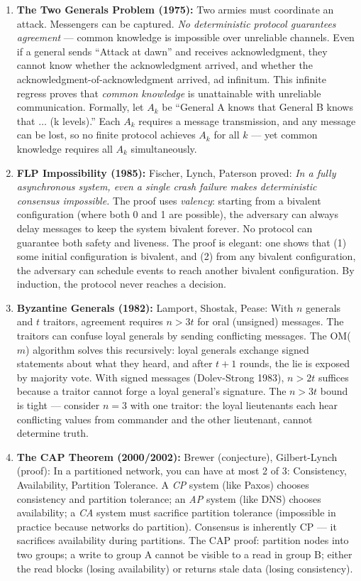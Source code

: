\begin{enumerate}
\item \textbf{The Two Generals Problem (1975):} Two armies must coordinate an attack. Messengers can be captured. \emph{No deterministic protocol guarantees agreement} — common knowledge is impossible over unreliable channels. Even if a general sends ``Attack at dawn'' and receives acknowledgment, they cannot know whether the acknowledgment arrived, and whether the acknowledgment-of-acknowledgment arrived, ad infinitum. This infinite regress proves that \emph{common knowledge} is unattainable with unreliable communication. Formally, let $A_k$ be ``General A knows that General B knows that $\ldots$ (k levels).'' Each $A_k$ requires a message transmission, and any message can be lost, so no finite protocol achieves $A_k$ for all $k$ — yet common knowledge requires all $A_k$ simultaneously.

\item \textbf{FLP Impossibility (1985):} Fischer, Lynch, Paterson proved: \emph{In a fully asynchronous system, even a single crash failure makes deterministic consensus impossible.} The proof uses \emph{valency}: starting from a bivalent configuration (where both 0 and 1 are possible), the adversary can always delay messages to keep the system bivalent forever. No protocol can guarantee both safety and liveness. The proof is elegant: one shows that (1) some initial configuration is bivalent, and (2) from any bivalent configuration, the adversary can schedule events to reach another bivalent configuration. By induction, the protocol never reaches a decision.

\item \textbf{Byzantine Generals (1982):} Lamport, Shostak, Pease: With $n$ generals and $t$ traitors, agreement requires $n > 3t$ for oral (unsigned) messages. The traitors can confuse loyal generals by sending conflicting messages. The OM($m$) algorithm solves this recursively: loyal generals exchange signed statements about what they heard, and after $t+1$ rounds, the lie is exposed by majority vote. With signed messages (Dolev-Strong 1983), $n > 2t$ suffices because a traitor cannot forge a loyal general's signature. The $n > 3t$ bound is tight — consider $n = 3$ with one traitor: the loyal lieutenants each hear conflicting values from commander and the other lieutenant, cannot determine truth.

\item \textbf{The CAP Theorem (2000/2002):} Brewer (conjecture), Gilbert-Lynch (proof): In a partitioned network, you can have at most 2 of 3: Consistency, Availability, Partition Tolerance. A \emph{CP} system (like Paxos) chooses consistency and partition tolerance; an \emph{AP} system (like DNS) chooses availability; a \emph{CA} system must sacrifice partition tolerance (impossible in practice because networks do partition). Consensus is inherently CP — it sacrifices availability during partitions. The CAP proof: partition nodes into two groups; a write to group A cannot be visible to a read in group B; either the read blocks (losing availability) or returns stale data (losing consistency).
\end{enumerate}

